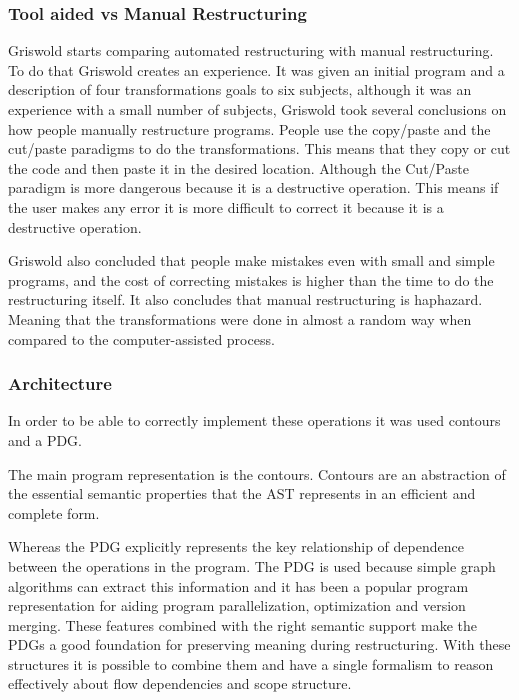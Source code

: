 \subsubsection{Tool aided vs Manual Restructuring}
Griswold starts comparing automated restructuring with manual restructuring. 
To do that Griswold creates an experience.
It was given an initial program and a description of four transformations goals to six subjects, although it was an experience with a small number of subjects, Griswold took several conclusions on how people manually restructure programs.
People use the copy/paste and the cut/paste paradigms to do the transformations. 
This means that they copy or cut the code and then paste it in the desired location.
Although the Cut/Paste paradigm is more dangerous because it is a destructive operation. 
This means if the user makes any error it is more difficult to correct it because it is a destructive operation.

Griswold also concluded that people make mistakes even with small and simple programs, and the cost of correcting mistakes is higher than the time to do the restructuring itself. 
It also concludes that manual restructuring is haphazard. 
Meaning that the transformations were done in almost a random way when compared to the computer-assisted process.


\subsubsection{Architecture}

In order to be able to correctly implement these operations it was used contours and a PDG.

The main program representation is the contours. 
Contours are an abstraction of the essential semantic properties that the AST represents in an efficient and complete form.

Whereas the PDG explicitly represents the key relationship of dependence between the operations in the program. 
The PDG is used because simple graph algorithms can extract this information and it has been a popular program representation for aiding program parallelization, optimization and version merging.
These features combined with the right semantic support make the PDGs a good foundation for preserving meaning during restructuring.
With these structures it is possible to combine them and have a single formalism to reason effectively about flow dependencies and scope structure.

